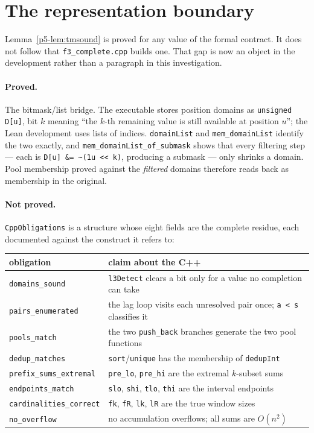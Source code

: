 \documentclass[11pt,a4paper,oneside]{report}
\theoremstyle{definition}
\begin{document}
\section{The representation boundary}
\label{p5-sec:repboundary}

Lemma~\ref{p5-lem:tmsound} is proved for any value of the formal contract. It does
not follow that \texttt{f3\_complete.cpp} builds one. That gap is now an object
in the development rather than a paragraph in this investigation.

\paragraph{Proved.} The bitmask/list bridge. The executable stores position
domains as \texttt{unsigned D[u]}, bit $k$ meaning ``the $k$-th remaining value is
still available at position $u$''; the Lean development uses lists of indices.
\texttt{domainList} and \texttt{mem\_domainList} identify the two exactly, and
\texttt{mem\_domainList\_of\_submask} shows that every filtering step --- each is
\texttt{D[u] \&= \~{}(1u <\!< k)}, producing a submask --- only shrinks a domain.
Pool membership proved against the \emph{filtered} domains therefore reads back
as membership in the original.

\paragraph{Not proved.} \texttt{CppObligations} is a structure whose eight fields
are the complete residue, each documented against the construct it refers to:

\begin{center}
\begin{tabular}{@{}ll@{}}
\toprule
obligation & claim about the C++ \\
\midrule
\texttt{domains\_sound} & \texttt{l3Detect} clears a bit only for a value no completion can take \\
\texttt{pairs\_enumerated} & the lag loop visits each unresolved pair once; \texttt{a < s} classifies it \\
\texttt{pools\_match} & the two \texttt{push\_back} branches generate the two pool functions \\
\texttt{dedup\_matches} & \texttt{sort}/\texttt{unique} has the membership of \texttt{dedupInt} \\
\texttt{prefix\_sums\_extremal} & \texttt{pre\_lo}, \texttt{pre\_hi} are the extremal $k$-subset sums \\
\texttt{endpoints\_match} & \texttt{slo}, \texttt{shi}, \texttt{tlo}, \texttt{thi} are the interval endpoints \\
\texttt{cardinalities\_correct} & \texttt{fk}, \texttt{fR}, \texttt{lk}, \texttt{lR} are the true window sizes \\
\texttt{no\_overflow} & no accumulation overflows; all sums are $O(n^2)$ \\
\bottomrule
\end{tabular}
\end{center}
\end{document}

